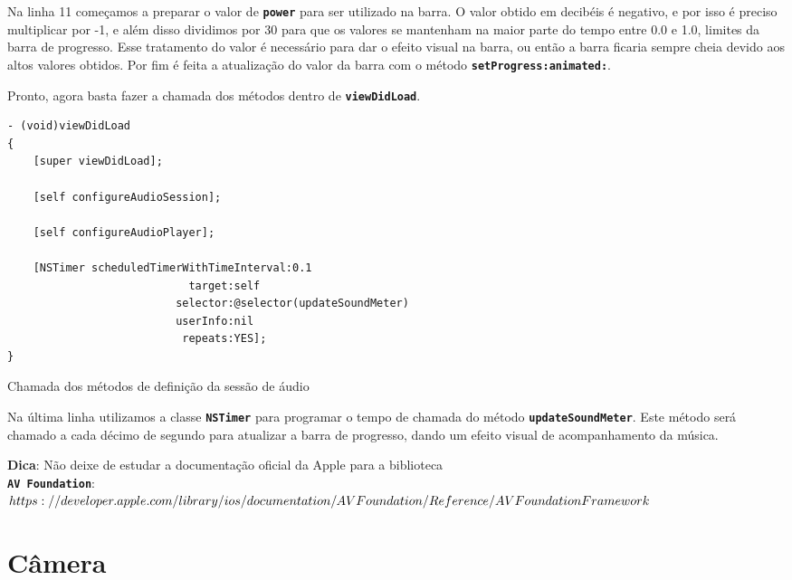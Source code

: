 \documentclass[a4paper,12pt,brazil,doubleside]{book}
\begin{document}
\begin{singlespace}
Na linha 11 começamos a preparar o valor de \texttt{\textbf{power}} para ser utilizado na barra. O valor obtido em decibéis é negativo, e por isso é preciso multiplicar por -1, e além disso dividimos por 30 para que os valores se mantenham na maior parte do tempo entre 0.0 e 1.0, limites da barra de progresso. Esse tratamento do valor é necessário para dar o efeito visual na barra, ou então a barra ficaria sempre cheia devido aos altos valores obtidos. Por fim é feita a atualização do valor da barra com o método \texttt{\textbf{setProgress:animated:}}.

Pronto, agora basta fazer a chamada dos métodos dentro de \texttt{\textbf{viewDidLoad}}.

\begin{listing}[H]
\begin{verbatim}
- (void)viewDidLoad
{
    [super viewDidLoad];
    
    [self configureAudioSession];
    
    [self configureAudioPlayer];
    
    [NSTimer scheduledTimerWithTimeInterval:0.1
                            target:self
                          selector:@selector(updateSoundMeter)
                          userInfo:nil
                           repeats:YES];
}
\end{verbatim}
\caption{Chamada dos métodos de definição da sessão de áudio}
\end{listing}


Na última linha utilizamos a classe \texttt{\textbf{NSTimer}} para programar o tempo de chamada do método \texttt{\textbf{updateSoundMeter}}. Este método será chamado a cada décimo de segundo para atualizar a barra de progresso, dando um efeito visual de acompanhamento da música.

\begin{framed}

\textbf{Dica}: Não deixe de estudar a documentação oficial da Apple para a biblioteca\\  \texttt{\textbf{AV Foundation}}:\\
\(https://developer.apple.com/library/ios/documentation/AVFoundation/Reference/\\AVFoundationFramework\)
\end{framed}

\section{Câmera}



\end{singlespace}
\end{document}
